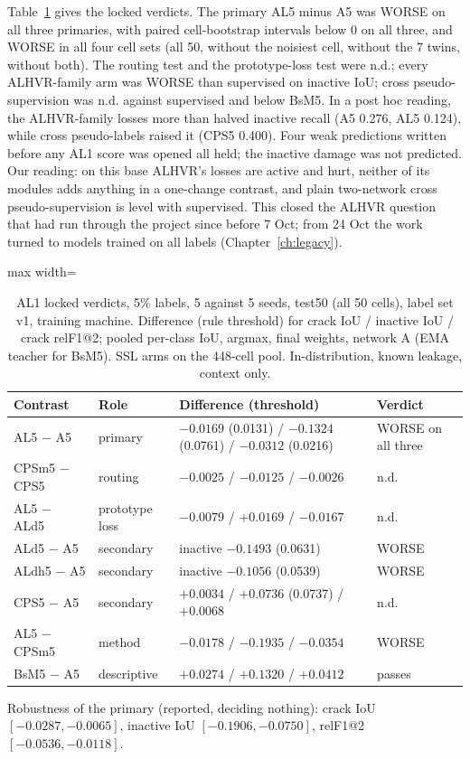 Table~\ref{tab:pseries-al1} gives the locked verdicts. The primary AL5 minus A5 was WORSE on all three primaries, with paired
cell-bootstrap intervals below 0 on all three, and WORSE in all four cell sets (all 50, without the noisiest cell, without the 7 twins,
without both). The routing test and the prototype-loss test were n.d.; every ALHVR-family arm was WORSE than supervised on inactive
IoU; cross pseudo-supervision was n.d. against supervised and below BsM5. In a post hoc reading, the ALHVR-family losses more than
halved inactive recall (A5 0.276, AL5 0.124), while cross pseudo-labels raised it (CPS5 0.400). Four weak predictions written before
any AL1 score was opened all held; the inactive damage was not predicted. Our reading: on this base ALHVR's losses are active and
hurt, neither of its modules adds anything in a one-change contrast, and plain two-network cross pseudo-supervision is level with
supervised. This closed the ALHVR question that had run through the project since before 7 Oct; from 24 Oct the work turned to models
trained on all labels (Chapter~\ref{ch:legacy}).

\begin{table}[htbp]
\centering\small
\caption{AL1 locked verdicts, 5\% labels, 5 against 5 seeds, test50 (all 50 cells), label set v1, training machine. Difference
(rule threshold) for crack IoU / inactive IoU / crack relF1@2; pooled per-class IoU, argmax, final weights, network A (EMA teacher for BsM5). SSL arms on the
448-cell pool. In-distribution, known leakage, context only.}
\label{tab:pseries-al1}
\begin{adjustbox}{max width=\linewidth}
\begin{tabular}{@{}llll@{}}
\toprule
Contrast & Role & Difference (threshold) & Verdict \\
\midrule
AL5 $-$ A5 & primary & $-0.0169$ (0.0131) / $-0.1324$ (0.0761) / $-0.0312$ (0.0216) & WORSE on all three \\
CPSm5 $-$ CPS5 & routing & $-0.0025$ / $-0.0125$ / $-0.0026$ & n.d. \\
AL5 $-$ ALd5 & prototype loss & $-0.0079$ / $+0.0169$ / $-0.0167$ & n.d. \\
ALd5 $-$ A5 & secondary & inactive $-0.1493$ (0.0631) & WORSE \\
ALdh5 $-$ A5 & secondary & inactive $-0.1056$ (0.0539) & WORSE \\
CPS5 $-$ A5 & secondary & $+0.0034$ / $+0.0736$ (0.0737) / $+0.0068$ & n.d. \\
AL5 $-$ CPSm5 & method & $-0.0178$ / $-0.1935$ / $-0.0354$ & WORSE \\
BsM5 $-$ A5 & descriptive & $+0.0274$ / $+0.1320$ / $+0.0412$ & passes \\
\bottomrule
\end{tabular}
\end{adjustbox}
\end{table}
Robustness of the primary (reported, deciding nothing): crack IoU $[-0.0287, -0.0065]$, inactive IoU $[-0.1906, -0.0750]$, relF1@2
$[-0.0536, -0.0118]$.

